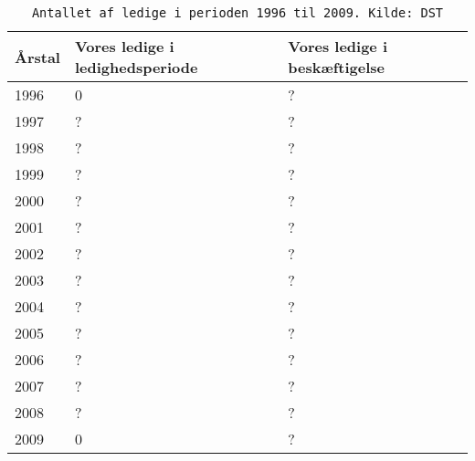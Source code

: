 \begin{table}[H] \centering
\caption{\texttt{Antallet af ledige i perioden 1996 til 2009. Kilde: DST}}
\label{tab_SOCSTIL}
\begin{tabular}{@{}lll@{}} \toprule
Årstal & Vores ledige i ledighedsperiode & Vores ledige i beskæftigelse \\ \midrule
1996  & 0 & ? \\ 
1997  & ? & ? \\ 
1998  & ? & ? \\ 
1999  & ? & ? \\ 
2000  & ? & ? \\ 
2001  & ? & ? \\ 
2002  & ? & ? \\ 
2003  & ? & ? \\ 
2004  & ? & ? \\ 
2005  & ? & ? \\ 
2006  & ? & ? \\ 
2007  & ? & ? \\ 
2008  & ? & ? \\ 
2009  & 0 & ? \\  \bottomrule
\end{tabular} \end{table}
% 

























